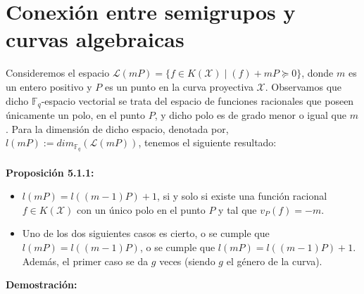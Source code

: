 \documentclass[11pt,spanish]{book}
\begin{document}
\section{Conexión entre semigrupos y curvas algebraicas}
Consideremos el espacio $\mathcal{L}(mP)=\{f\in K(\mathbf{\mathcal{X}})\;|\; (f)+mP\succeq0\}$, donde $m$ es un entero positivo y $P$ es un punto en la curva proyectiva $\mathbf{\mathcal{X}}$. Observamos que dicho $\mathbb{F}_q$-espacio vectorial se trata del espacio de funciones racionales que poseen únicamente un polo, en el punto $P$, y dicho polo es de grado menor o igual que $m$. Para la dimensión de dicho espacio, denotada por, $l(mP):=dim_{\mathbb{F}_q}(\mathcal{L}(mP))$, tenemos el siguiente resultado:\\
\\\hypertarget{prop5.1.1}{\textbf{Proposición 5.1.1: }}
\begin{itemize}
    \item $l(mP)=l((m-1)P)+1$, si y solo si existe una función racional $f\in K(\mathbf{\mathcal{X}})$ con un único polo en el punto $P$ y tal que $v_P(f)=-m$.
    \item Uno de los dos siguientes casos es cierto, o se cumple que $l(mP)=l((m-1)P)$, o se cumple que $l(mP)=l((m-1)P)+1$. Además, el primer caso se da $g$ veces (siendo $g$ el género de la curva).
\end{itemize}
\textbf{Demostración: }
\end{document}
